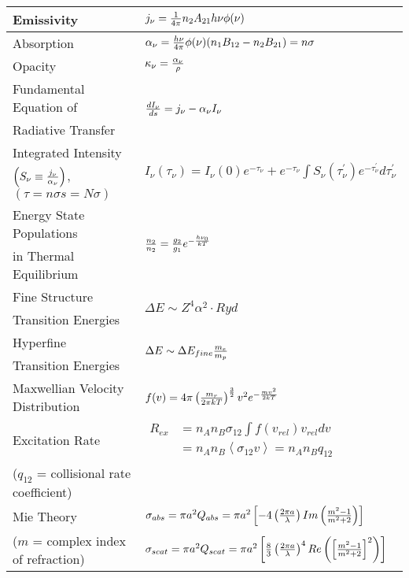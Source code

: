 \documentclass[10pt]{article}
\def\inv#1{{1\over #1}}
\def\mean#1{\left\langle #1\right\rangle}
\begin{document}
\begin{table}[h!]
\begin{tabular}{|l|l|}
\hline
Emissivity &
$j_\nu=\inv{4\pi}n_2 A_{21}h\nu\phi(\nu)$ \\

\hline
Absorption &
$\alpha_\nu={h\nu\over 4\pi}\phi(\nu)(n_1B_{12}-n_2B_{21})=n\sigma$ \\

\hline
Opacity &
$\kappa_{\nu}={\alpha_\nu\over \rho}$ \\

\hline
Fundamental Equation of & 
\multirow{2}{*}{${dI_\nu\over ds}=j_\nu-\alpha_\nu I_\nu$} \\
Radiative Transfer & \\

\hline
Integrated Intensity & 
\multirow{2}{*}{$I_\nu(\tau_\nu)=I_\nu(0)e^{-\tau_\nu}+
e^{-\tau_\nu}\int{S_\nu(\tau^\prime_\nu)
e^{-\tau^\prime_\nu}d\tau^\prime_\nu}$} \\
$\left(S_\nu\equiv{j_\nu\over\alpha_\nu}\right)$,
$(\tau=n\sigma s=N\sigma)$ & \\

\hline
Energy State Populations & 
\multirow{2}{*}{${n_2\over n_2}={g_2\over g_1}e^{-{h\nu_0\over kT}}$} \\
in Thermal Equilibrium & \\

\hline
Fine Structure & 
\multirow{2}{*}{$\Delta E\sim Z^4\alpha^2\cdot Ryd$} \\
Transition Energies & \\

\hline
Hyperfine & 
\multirow{2}{*}{$\Delta E\sim \Delta E_{fine}{m_e\over m_p}$} \\
Transition Energies & \\

\hline
Maxwellian Velocity Distribution &
$f(v)=4\pi\left({m_r\over 2\pi kT}\right)^\frac32 v^2 e^{-{mv^2\over 2kT}}$ \\

\hline
Excitation Rate & 
$\begin{aligned}R_{ex}&=n_An_B\sigma_{12}
\int{f(v_{rel})v_{rel}dv}\\
&=n_An_B\mean{\sigma_{12}v}= n_An_Bq_{12}\end{aligned}$ \\
($q_{12}$ = collisional rate coefficient) & \\

\hline
Mie Theory & 
$\sigma_{abs}=\pi a^2Q_{abs}=\pi a^2\left[-4\left(
{2\pi a\over\lambda}\right) Im\left({m^2-1\over m^2+2}\right)\right]$ \\
($m$ = complex index of refraction) & 
$\sigma_{scat}=\pi a^2Q_{scat}=\pi a^2\left[\frac83\left({2\pi a\over\lambda}
\right)^4 Re\left(\left[{m^2-1\over m^2+2}\right]^2\right)\right]$ \\


\end{tabular}
\end{table}
\end{document}
